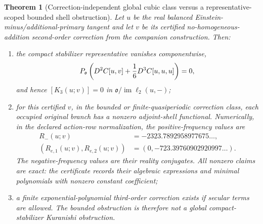 \documentclass[11pt]{article}
\newtheorem{theorem}{Theorem}[section]
\theoremstyle{definition}
\theoremstyle{remark}
\begin{document}
\begin{theorem}[Correction-independent global cubic class versus a
representative-scoped bounded shell obstruction]
\label{thm:balanced-third-order}
Let $u$ be the real balanced Einstein-minus/additional-primary tangent and
let $v$ be its certified no-homogeneous-addition second-order correction from
the companion construction.  Then:
\begin{enumerate}
\item the compact stabilizer representative vanishes componentwise,
\[
 P_{\mathfrak o}\left(D^2C[u,v]+{1\over6}D^3C[u,u,u]\right)=0,
\]
and hence $[K_3(u;v)]=0$ in
$\mathfrak o/\operatorname{im}\ell_2(u,-)$;
\item for this certified \(v\), in the bounded or finite-quasiperiodic
correction class, each occupied original branch has a nonzero adjoint-shell
functional.  Numerically, in the declared action-row normalization, the
positive-frequency values are
\[
 \begin{aligned}
 R_-(u;v)&=-2323.7892958977675\ldots,\\
 (R_{e,1}(u;v),R_{e,2}(u;v))
   &=(0,-723.39760902920997\ldots).
 \end{aligned}
\]
The negative-frequency values are their reality conjugates.  All nonzero
claims are exact: the certificate records their algebraic expressions and
minimal polynomials with nonzero constant coefficient;
\item a finite exponential-polynomial third-order correction exists if
secular terms are allowed.  The bounded obstruction is therefore not a
global compact-stabilizer Kuranishi obstruction.
\end{enumerate}
\end{theorem}
\end{document}
